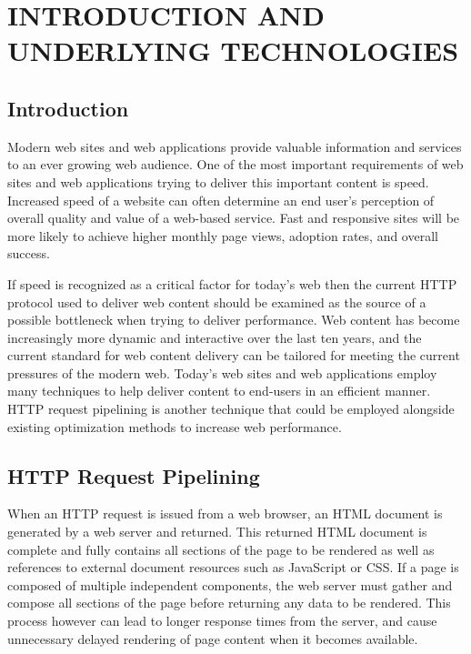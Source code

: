\documentclass[12pt]{report}
\begin{document}
\chapter{INTRODUCTION AND UNDERLYING TECHNOLOGIES}

\section{Introduction}
Modern web sites and web applications provide valuable information and services to an ever growing web audience. One of the most important requirements of web sites and web applications trying to deliver this important content is speed. Increased speed of a website can often determine an end user's perception of overall quality and value of a web-based service. Fast and responsive sites will be more likely to achieve higher monthly page views, adoption rates, and overall success.

If speed is recognized as a critical factor for today's web then the current HTTP protocol used to deliver web content should be examined as the source of a possible bottleneck when trying to deliver performance. Web content has become increasingly more dynamic and interactive over the last ten years, and the current standard for web content delivery can be tailored for meeting the current pressures of the modern web. Today's web sites and web applications employ many techniques to help deliver content to end-users in an efficient manner. HTTP request pipelining is another technique that could be employed alongside existing optimization methods to increase web performance.

\section{HTTP Request Pipelining}

 When an HTTP request is issued from a web browser, an HTML document is generated by a web server and returned. This returned HTML document is complete and fully contains all sections of the page to be rendered as well as references to external document resources such as JavaScript or CSS. If a page is composed of multiple independent components, the web server must gather and compose all sections of the page before returning any data to be rendered. This process however can lead to longer response times from the server, and cause unnecessary delayed rendering of page content when it becomes available.
\end{document}

